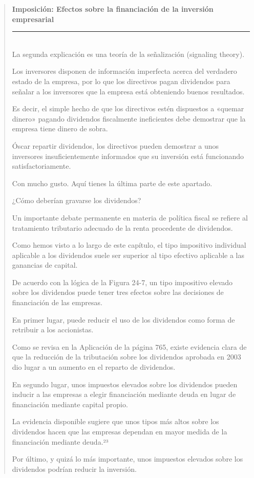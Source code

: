 \documentclass[10pt,a4paper]{article}
\newenvironment{specialblock}[1]{%
      \begin{quote} %
      \small %
      \noindent\textbf{#1}\\[-0.3em] %
      \rule{\linewidth}{0.4pt}\\[0.6em]}{
      \end{quote}}
\begin{document}
\begin{specialblock}{Imposición: Efectos sobre la financiación de la inversión empresarial}
    La segunda explicación es una teoría de la señalización (signaling theory).
    
    Los inversores disponen de información imperfecta acerca del verdadero estado de la empresa, por lo que los directivos pagan dividendos para señalar a los inversores que la empresa está obteniendo buenos resultados.
    
    Es decir, el simple hecho de que los directivos estén dispuestos a «quemar dinero» pagando dividendos fiscalmente ineficientes debe demostrar que la empresa tiene dinero de sobra.
    
    Óscar repartir dividendos, los directivos pueden demostrar a unos inversores insuficientemente informados que su inversión está funcionando satisfactoriamente.
    
    Con mucho gusto. Aquí tienes la última parte de este apartado.
    
    ¿Cómo deberían gravarse los dividendos?
    
    Un importante debate permanente en materia de política fiscal se refiere al tratamiento tributario adecuado de la renta procedente de dividendos.
    
    Como hemos visto a lo largo de este capítulo, el tipo impositivo individual aplicable a los dividendos suele ser superior al tipo efectivo aplicable a las ganancias de capital.
    
    De acuerdo con la lógica de la Figura 24-7, un tipo impositivo elevado sobre los dividendos puede tener tres efectos sobre las decisiones de financiación de las empresas.
    
    En primer lugar, puede reducir el uso de los dividendos como forma de retribuir a los accionistas.
    
    Como se revisa en la Aplicación de la página 765, existe evidencia clara de que la reducción de la tributación sobre los dividendos aprobada en 2003 dio lugar a un aumento en el reparto de dividendos.
    
    En segundo lugar, unos impuestos elevados sobre los dividendos pueden inducir a las empresas a elegir financiación mediante deuda en lugar de financiación mediante capital propio.
    
    La evidencia disponible sugiere que unos tipos más altos sobre los dividendos hacen que las empresas dependan en mayor medida de la financiación mediante deuda.²³
    
    Por último, y quizá lo más importante, unos impuestos elevados sobre los dividendos podrían reducir la inversión.
    

\end{specialblock}
\end{document}
